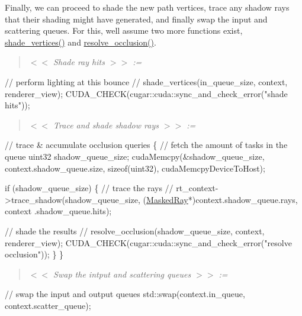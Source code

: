 \begin{DoxyParagraph}{}
Finally, we can proceed to shade the new path vertices, trace any shadow rays that their shading might have generated, and finally swap the input and scattering queues. For this, we\textquotesingle{}ll assume two more functions exist, \hyperlink{_hello_renderer_page_shade_vertices_anchor}{shade\+\_\+vertices()} and \hyperlink{_hello_renderer_page_resolve_occlusion_anchor}{resolve\+\_\+occlusion()}. ~\newline
\label{_hello_renderer_page_Shade_ray_hits_anchor}%
%
 \begin{quote}
{\itshape  $<$$<$ Shade ray hits $>$$>$ \+:= }

\end{quote}

\begin{DoxyCode}
\textcolor{comment}{// perform lighting at this bounce}
\textcolor{comment}{//}
shade\_vertices(in\_queue\_size, context, renderer\_view);
CUDA\_CHECK(cugar::cuda::sync\_and\_check\_error(\textcolor{stringliteral}{"shade hits"}));
\end{DoxyCode}
 \label{_hello_renderer_page_Trace_and_shade_shadow_rays_anchor}%
%
 \begin{quote}
{\itshape  $<$$<$ Trace and shade shadow rays $>$$>$ \+:= }

\end{quote}

\begin{DoxyCode}
\textcolor{comment}{// trace & accumulate occlusion queries}
\{
    \textcolor{comment}{// fetch the amount of tasks in the queue}
    uint32 shadow\_queue\_size;
    cudaMemcpy(&shadow\_queue\_size, context.shadow\_queue.size, \textcolor{keyword}{sizeof}(uint32), cudaMemcpyDeviceToHost);

    \textcolor{keywordflow}{if} (shadow\_queue\_size)
    \{
        \textcolor{comment}{// trace the rays}
        \textcolor{comment}{//}
        rt\_context->trace\_shadow(shadow\_queue\_size, (\hyperlink{struct_masked_ray}{MaskedRay}*)context.shadow\_queue.rays, context
      .shadow\_queue.hits);

        \textcolor{comment}{// shade the results}
        \textcolor{comment}{//}
        resolve\_occlusion(shadow\_queue\_size, context, renderer\_view);
        CUDA\_CHECK(cugar::cuda::sync\_and\_check\_error(\textcolor{stringliteral}{"resolve occlusion"}));
    \}
\}
\end{DoxyCode}
 \label{_hello_renderer_page_Swap_the_intput_and_scattering_queues_anchor}%
%
 \begin{quote}
{\itshape  $<$$<$ Swap the intput and scattering queues $>$$>$ \+:= }

\end{quote}

\begin{DoxyCode}
\textcolor{comment}{// swap the input and output queues}
std::swap(context.in\_queue, context.scatter\_queue);
\end{DoxyCode}

\end{DoxyParagraph}

